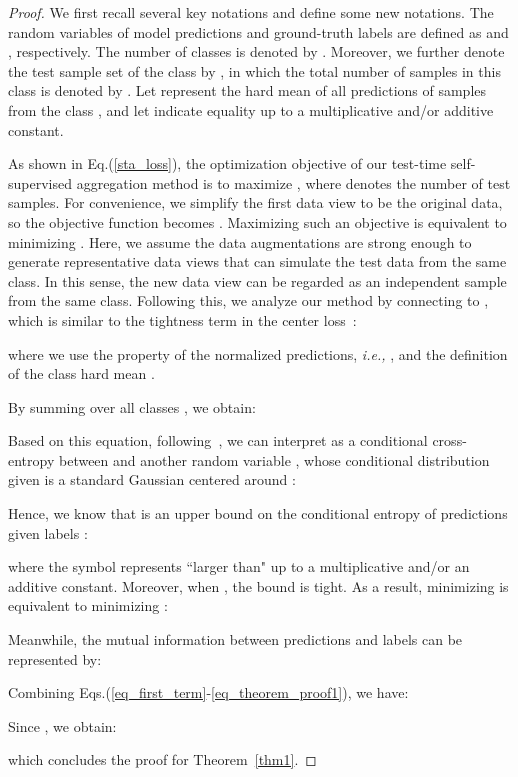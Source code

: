 \documentclass{article}
\def\ie{\emph{i.e.}} \def\Ie{\emph{I.e.}}
\def\ie{\emph{i.e., }}
\begin{document}
\begin{proof}
We first recall several  key notations   and   define some new notations. The random variables of model predictions  and ground-truth labels are defined as   and , respectively. The  number of classes is denoted by . Moreover, we further denote the test sample set of the  class  by , in which the total number of samples in this class is denoted by .   
Let  represent the hard mean of all  predictions of samples from the class ,  and let   indicate  equality up to a multiplicative and/or additive constant. 
 
As shown in Eq.(\ref{sta_loss}), the optimization objective of our test-time self-supervised aggregation method is to maximize  , where  denotes the number of test samples. For convenience, we simplify the first data view to be the original data, so the objective function becomes .
Maximizing such an objective is equivalent to minimizing . Here, we assume the data augmentations are strong enough to generate representative data views that can simulate  the test data from the same class. In this sense, the new data  view can be regarded  as an independent sample from the same class.  
Following this, we    analyze our method   by connecting  to , which is similar to the tightness term  in the center loss~\cite{wen2016discriminative}:

where we use the property of the normalized predictions, \ie , and the definition of the class hard mean .
 

By summing over all classes , we obtain:


Based on this equation, following~\cite{boudiaf2020unifying,Zhang2021UnleashingTP}, we can interpret  as a conditional cross-entropy between  and another random variable , whose conditional distribution given  is a standard Gaussian centered around :

Hence, we know that  is an upper bound on the conditional entropy of predictions  given labels :
 
where the symbol  represents  ``larger than" up to a multiplicative and/or an additive constant. Moreover, when , the bound is tight.  As a result, minimizing   is equivalent  to minimizing :


Meanwhile,  the mutual information between  predictions  and  labels  can be represented by:


Combining Eqs.(\ref{eq_first_term}-\ref{eq_theorem_proof1}), we have:


Since , we obtain:

which concludes the proof for  Theorem~\ref{thm1}.
\end{proof}
 
\end{document}
